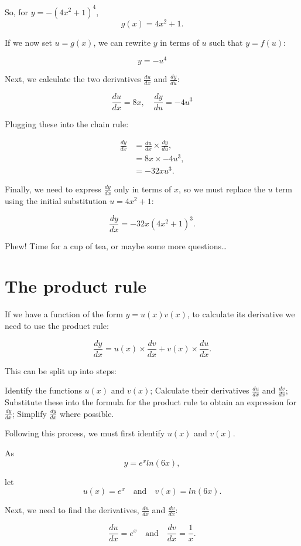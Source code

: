 \documentclass[
  a4paper,
]{scrbook}
\begin{document}
So, for \(y=-(4x^2+1)^4\), \[
g(x)=4x^2+1.
\]

If we now set \(u=g(x)\), we can rewrite \(y\) in terms of \(u\) such
that \(y=f(u)\):

\[
y=-u^4
\]

Next, we calculate the two derivatives \(\frac{du}{dx}\) and
\(\frac{dy}{du}\):

\[
\frac{du}{dx}=8x, \quad \frac{dy}{du}=-4u^3
\]

Plugging these into the chain rule:

\[
\begin{aligned}
\frac{dy}{dx} &= \frac{du}{dx} \times \frac{dy}{du}, \\
&= 8x \times-4u^3, \\ 
&= -32xu^3. 
\end{aligned} 
\]

Finally, we need to express \(\frac{dy}{dx}\) only in terms of \(x\), so
we must replace the \(u\) term using the initial substitution
\(u=4x^2+1\):

\[
\frac{dy}{dx} =-32x(4x^2+1)^3.
\]

Phew! Time for a cup of tea, or maybe some more questions\ldots{}

\section{The product rule}\label{the-product-rule}

If we have a function of the form \(y=u(x)v(x)\), to calculate its
derivative we need to use the product rule:

\[
\dfrac{dy}{dx} = u(x) \times \dfrac{dv}{dx} + v(x) \times\dfrac{du}{dx}.
\]

This can be split up into steps:

Identify the functions \(u(x)\) and \(v(x)\); Calculate their
derivatives \(\tfrac{du}{dx}\) and \(\tfrac{dv}{dx}\); Substitute these
into the formula for the product rule to obtain an expression for
\(\tfrac{dy}{dx}\); Simplify \(\tfrac{dy}{dx}\) where possible.

Following this process, we must first identify \(u(x)\) and \(v(x)\).

As \[
y=e^x ln(6x),
\]

let \[
u(x) = e^x \quad \text{and} \quad v(x)=ln(6x).
\]

Next, we need to find the derivatives, \(\tfrac{du}{dx}\) and
\(\tfrac{dv}{dx}\):

\[
\dfrac{du}{dx} = e^x\quad \text{and} \quad\dfrac{dv}{dx}=\dfrac{1}{x}.
\]
\end{document}
